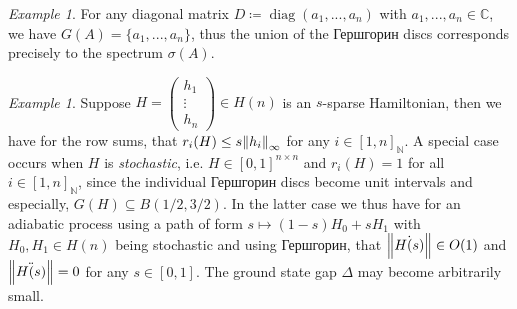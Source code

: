 \documentclass[10pt]{amsart}
\theoremstyle{definition}
\theoremstyle{remark}
\newtheorem{example}[theorem]{Example}
\DeclareMathOperator{\diag}{diag}
\begin{document}
    \begin{example}
        For any diagonal matrix \(D \coloneqq \diag(a_1, ..., a_n)\) with \(a_1, ..., a_n \in \mathbb{C}\), we have \(G(A) = \{a_1, ..., a_n\}\), thus the union of the Гершгорин discs corresponds precisely to the spectrum \(\sigma(A)\).
    \end{example}

    \begin{example} \label{example_stochastic}
        Suppose \(H = \begin{pmatrix}h_1\\\vdots\\h_n\end{pmatrix} \in H(n)\) is an \(s\)-sparse Hamiltonian, then we have for the row sums, that \(r_i(H) \leq s\norm{h_i}_\infty\) for any \(i \in [1, n]_{\mathbb{N}}\). A special case occurs when \(H\) is \emph{stochastic}, i.e. \(H \in [0, 1]^{n \times n}\) and \(r_i(H) = 1\) for all \(i \in [1, n]_{\mathbb{N}}\), since the individual Гершгорин discs become unit intervals and especially, \(G(H) \subseteq B(1/2, 3/2)\). In the latter case we thus have for an adiabatic process using a path of form \(s \mapsto (1-s)H_0 + sH_1\) with \(H_0, H_1 \in H(n)\) being stochastic and using Гершгорин, that \(\norm{\dot{H(s)}} \in O(1)\) and \(\norm{\ddot{H(s)}} = 0\) for any \(s \in [0, 1]\). The ground state gap \(\Delta\) may become arbitrarily small.
    \end{example}
\end{document}
